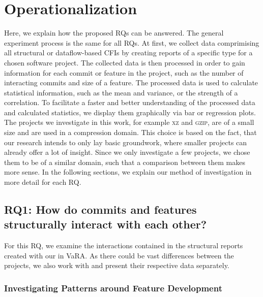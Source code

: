 \section{Operationalization}\label{sec:operationalization}

Here, we explain how the proposed RQs can be answered.
The general experiment process is the same for all RQs.
At first, we collect data comprimising all structural or dataflow-based CFIs by creating reports of a specific type for a chosen software project.
The collected data is then processed in order to gain information for each commit or feature in the project, such as the number of interacting commits and size of a feature.
The processed data is used to calculate statistical information, such as the mean and variance, or the strength of a correlation.
To facilitate a faster and better understanding of the processed data and calculated statistics, we display them graphically via bar or regression plots.
The projects we investigate in this work, for example \textsc{xz} and \textsc{gzip}, are of a small size and are used in a compression domain.
This choice is based on the fact, that our research intends to only lay basic groundwork, where smaller projects can already offer a lot of insight.
Since we only investigate a few projects, we chose them to be of a similar domain, such that a comparison between them makes more sense.
In the following sections, we explain our method of investigation in more detail for each RQ.

\subsection*{\textbf{RQ1: How do commits and features structurally interact with each other?}}

For this RQ, we examine the interactions contained in the structural reports created with our  in VaRA.
As there could be vast differences between the projects, we also work with and present their respective data separately.

\subsubsection*{Investigating Patterns around Feature Development}


